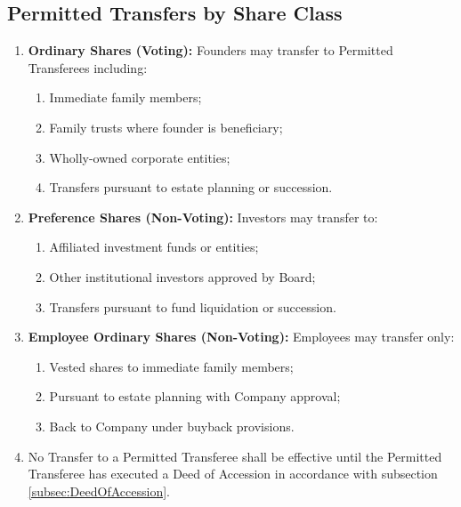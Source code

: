 \subsection{Permitted Transfers by Share Class} \label{subsec:PermittedTransfers}
\begin{enumerate}[label=(\alph*)]
\item \textbf{Ordinary Shares (Voting):} Founders may transfer to Permitted Transferees including:
    \begin{enumerate}[label=(\roman*)]
    \item Immediate family members;
    \item Family trusts where founder is beneficiary;
    \item Wholly-owned corporate entities;
    \item Transfers pursuant to estate planning or succession.
    \end{enumerate}
\item \textbf{Preference Shares (Non-Voting):} Investors may transfer to:
    \begin{enumerate}[label=(\roman*)]
    \item Affiliated investment funds or entities;
    \item Other institutional investors approved by Board;
    \item Transfers pursuant to fund liquidation or succession.
    \end{enumerate}
\item \textbf{Employee Ordinary Shares (Non-Voting):} Employees may transfer only:
    \begin{enumerate}[label=(\roman*)]
    \item Vested shares to immediate family members;
    \item Pursuant to estate planning with Company approval;
    \item Back to Company under buyback provisions.
    \end{enumerate}
\item No Transfer to a Permitted Transferee shall be effective until the Permitted Transferee has executed a Deed of Accession in accordance with subsection \ref{subsec:DeedOfAccession}.
\end{enumerate}

